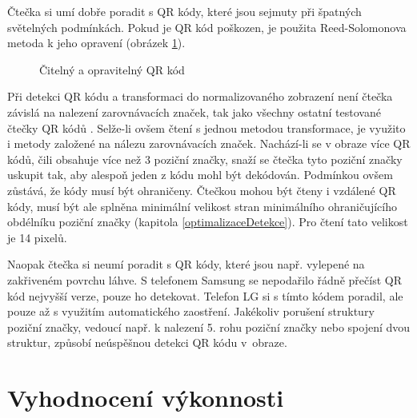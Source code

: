 Čtečka si umí dobře poradit s QR kódy, které jsou sejmuty při špatných
světelných podmínkách. Pokud je QR kód poškozen, je použita Reed-Solomonova
metoda k jeho opravení (obrázek \ref{readableCodes}).

 \begin{figure}[H]
  \begin{center}
    \caption{Čitelný a opravitelný QR kód}
    \label{readableCodes}
  \end{center}
\end{figure}

Při detekci QR kódu a transformaci do
normalizovaného zobrazení není čtečka závislá na nalezení zarovnávacích značek,
tak jako všechny ostatní testované čtečky QR kódů
\cite{barcodeReaderZxing,scanLife,qrReaderForAndroid}. Selže-li ovšem čtení s
jednou metodou transformace, je využito i metody založené na nálezu zarovnávacích značek. Nachází-li se v obraze více QR kódů, čili obsahuje více
než 3 poziční značky, snaží se čtečka tyto poziční značky uskupit tak, aby
alespoň jeden z kódu mohl být dekódován. Podmínkou ovšem zůstává, že kódy musí
být ohraničeny. Čtečkou mohou být čteny i vzdálené QR kódy, musí být ale splněna
minimální velikost stran minimálního ohraničujícího obdélníku poziční značky
(kapitola \ref{optimalizaceDetekce}). Pro čtení tato velikost je 14 pixelů.

Naopak čtečka si neumí poradit s QR kódy, které jsou např. vylepené na
zakřiveném povrchu láhve. S telefonem Samsung se nepodařilo řádně přečíst QR kód
nejvyšší verze, pouze ho detekovat. Telefon LG si s tímto kódem poradil, ale
pouze až s využitím automatického zaostření. Jakékoliv porušení struktury
poziční značky, vedoucí např. k nalezení 5. rohu poziční značky nebo spojení
dvou struktur, způsobí neúspěšnou detekci QR kódu v~obraze.

\section{Vyhodnocení výkonnosti}
\label{vyhodnoceniVykonnosti}

